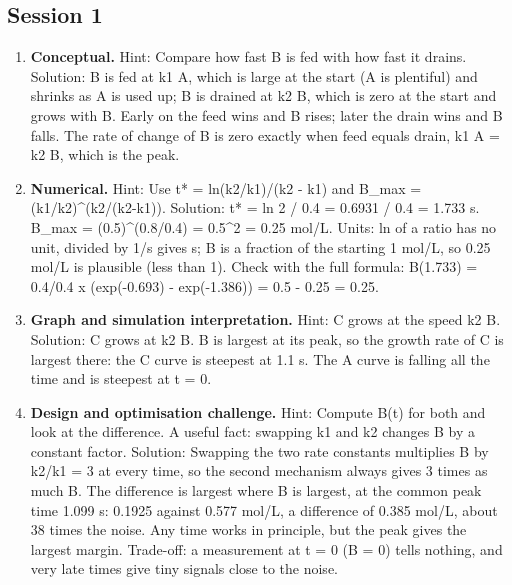 \documentclass[11pt,a4paper]{article}
\begin{document}
\subsection*{Session 1}
\begin{enumerate}[nosep]
\item \textbf{Conceptual.} Hint: Compare how fast B is fed with how fast it drains. Solution: B is fed at k1 A, which is large at the start (A is plentiful) and shrinks as A is used up; B is drained at k2 B, which is zero at the start and grows with B. Early on the feed wins and B rises; later the drain wins and B falls. The rate of change of B is zero exactly when feed equals drain, k1 A = k2 B, which is the peak.
\item \textbf{Numerical.} Hint: Use t* = ln(k2/k1)/(k2 - k1) and B\_max = (k1/k2)\textasciicircum{}(k2/(k2-k1)). Solution: t* = ln 2 / 0.4 = 0.6931 / 0.4 = 1.733 s. B\_max = (0.5)\textasciicircum{}(0.8/0.4) = 0.5\textasciicircum{}2 = 0.25 mol/L. Units: ln of a ratio has no unit, divided by 1/s gives s; B is a fraction of the starting 1 mol/L, so 0.25 mol/L is plausible (less than 1). Check with the full formula: B(1.733) = 0.4/0.4 x (exp(-0.693) - exp(-1.386)) = 0.5 - 0.25 = 0.25.
\item \textbf{Graph and simulation interpretation.} Hint: C grows at the speed k2 B. Solution: C grows at k2 B. B is largest at its peak, so the growth rate of C is largest there: the C curve is steepest at 1.1 s. The A curve is falling all the time and is steepest at t = 0.
\item \textbf{Design and optimisation challenge.} Hint: Compute B(t) for both and look at the difference. A useful fact: swapping k1 and k2 changes B by a constant factor. Solution: Swapping the two rate constants multiplies B by k2/k1 = 3 at every time, so the second mechanism always gives 3 times as much B. The difference is largest where B is largest, at the common peak time 1.099 s: 0.1925 against 0.577 mol/L, a difference of 0.385 mol/L, about 38 times the noise. Any time works in principle, but the peak gives the largest margin. Trade-off: a measurement at t = 0 (B = 0) tells nothing, and very late times give tiny signals close to the noise.
\end{enumerate}
\end{document}
